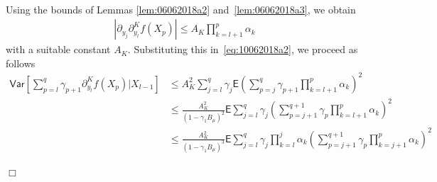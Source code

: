 \documentclass[bj]{imsart}
\newcommand{\proofendsign}{$\Box$}
\newenvironment{proof}{{\noindent \bf Proof }}
 {{\hspace*{\fill}\proofendsign\par\bigskip}}
\begin{document}
\begin{proof}
\begin{eqnarray*}
\end{eqnarray*}
Using the bounds of
Lemmas \ref{lem:06062018a2} and~\ref{lem:06062018a3},
we obtain
\begin{eqnarray}
\label{eq:part-part}
\left|\partial_{y_{j}}\partial_{y_{l}}^{K}f\left(X_{p}\right)\right|
\leq A_{K}\prod_{k=l+1}^{p}\alpha_{k}
\end{eqnarray}
with a suitable constant $A_{K}$.
Substituting this in~\eqref{eq:10062018a2},
we proceed as follows
\begin{align*}
\mathsf{Var}\left[\sum_{p=l}^{q}\gamma_{p+1}\partial_{y_{l}}^{K}f\left(X_{p}\right)\Big|X_{l-1}\right]
&\le
A_{K}^{2}\sum_{j=l}^{q}\gamma_{j}
\mathsf{E}\left(\sum_{p=j}^{q}\gamma_{p+1}\prod_{k=l+1}^{p}\alpha_{k}\right)^{2}
\\
&\le
\frac{A_{K}^{2}}{(1-\gamma_1 B_\mu)^2}
\mathsf{E}\sum_{j=l}^{q} \gamma_{j}
\left(
\sum_{p=j+1}^{q+1} \gamma_{p} \prod_{k=l+1}^{p} \alpha_{k}
\right)^{2}
\\
&\le
\frac{A_{K}^{2}}{(1-\gamma_1 B_\mu)^3}
\mathsf{E}\sum_{j=l}^{q} \gamma_{j}
\prod_{k=l}^{j} \alpha_{k}
\left(
\sum_{p=j+1}^{q+1} \gamma_{p} \prod_{k=j+1}^{p} \alpha_{k}
\right)^{2}
\end{align*}


\end{proof}
\end{document}
